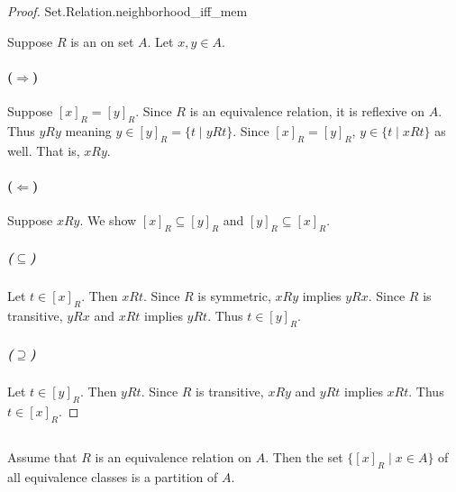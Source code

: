 \documentclass{report}
\begin{document}
\begin{proof}

    {Set.Relation.neighborhood\_iff\_mem}

  Suppose $R$ is an  on set $A$.
  Let $x, y \in A$.

  \paragraph{($\Rightarrow$)}%

    Suppose $[x]_R = [y]_R$.
    Since $R$ is an equivalence relation, it is reflexive on $A$.
    Thus $yRy$ meaning $y \in [y]_R = \{t \mid yRt\}$.
    Since $[x]_R = [y]_R$, $y \in \{t \mid xRt\}$ as well.
    That is, $xRy$.

  \paragraph{($\Leftarrow$)}%

    Suppose $xRy$.
    We show $[x]_R \subseteq [y]_R$ and $[y]_R \subseteq [x]_R$.

    \subparagraph{($\subseteq$)}%

      Let $t \in [x]_R$.
      Then $xRt$.
      Since $R$ is symmetric, $xRy$ implies $yRx$.
      Since $R$ is transitive, $yRx$ and $xRt$ implies $yRt$.
      Thus $t \in [y]_R$.

    \subparagraph{($\supseteq$)}%

      Let $t \in [y]_R$.
      Then $yRt$.
      Since $R$ is transitive, $xRy$ and $yRt$ implies $xRt$.
      Thus $t \in [x]_R$.

\end{proof}

\subsection{}%

\begin{theorem}[3P]

  Assume that $R$ is an equivalence relation on $A$.
  Then the set $\{[x]_R \mid x \in A\}$ of all equivalence classes is a
    partition of $A$.

\end{theorem}
\end{document}
